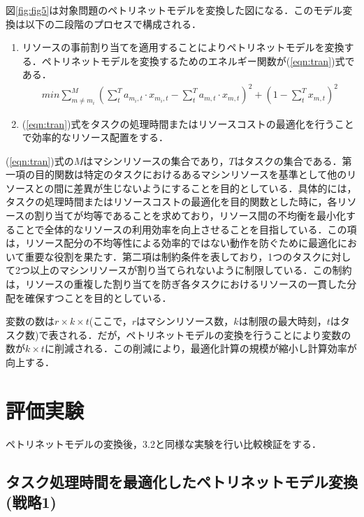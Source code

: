 図\ref{fig:fig5}は対象問題のペトリネットモデルを変換した図になる．このモデル変換は以下の二段階のプロセスで構成される．

\begin{enumerate} 
\item リソースの事前割り当てを適用することによりペトリネットモデルを変換する．ペトリネットモデルを変換するためのエネルギー関数が(\ref{eqn:tran})式である．
\begin{align} 
min \sum_{m \ne m_i}^M \left( \sum_t^T a_{m_i,t} \cdot x_{m_i,t} - \sum_t^T a_{m,t} \cdot x_{m,t}\right)^2 + \left(1 - \sum_t^T x_{m,t} \right)^2 \label{eqn:tran} 
\end{align}

\item (\ref{eqn:tran})式をタスクの処理時間またはリソースコストの最適化を行うことで効率的なリソース配置をする．
\end{enumerate}

(\ref{eqn:tran})式の$M$はマシンリソースの集合であり，$T$はタスクの集合である．第一項の目的関数は特定のタスクにおけるあるマシンリソースを基準として他のリソースとの間に差異が生じないようにすることを目的としている．具体的には，タスクの処理時間またはリソースコストの最適化を目的関数とした時に，各リソースの割り当てが均等であることを求めており，リソース間の不均衡を最小化することで全体的なリソースの利用効率を向上させることを目指している．この項は，リソース配分の不均等性による効率的ではない動作を防ぐために最適化において重要な役割を果たす．第二項は制約条件を表しており，1つのタスクに対して2つ以上のマシンリソースが割り当てられないように制限している．この制約は，リソースの重複した割り当てを防ぎ各タスクにおけるリソースの一貫した分配を確保すつことを目的としている．

変数の数は$r \times k \times t$(ここで，$r$はマシンリソース数，$k$は制限の最大時刻，$t$はタスク数)で表される．だが，ペトリネットモデルの変換を行うことにより変数の数が$k \times t$に削減される．この削減により，最適化計算の規模が縮小し計算効率が向上する．

\section{評価実験}
ペトリネットモデルの変換後，3.2と同様な実験を行い比較検証をする．

\subsection{タスク処理時間を最適化したペトリネットモデル変換(戦略1)}

